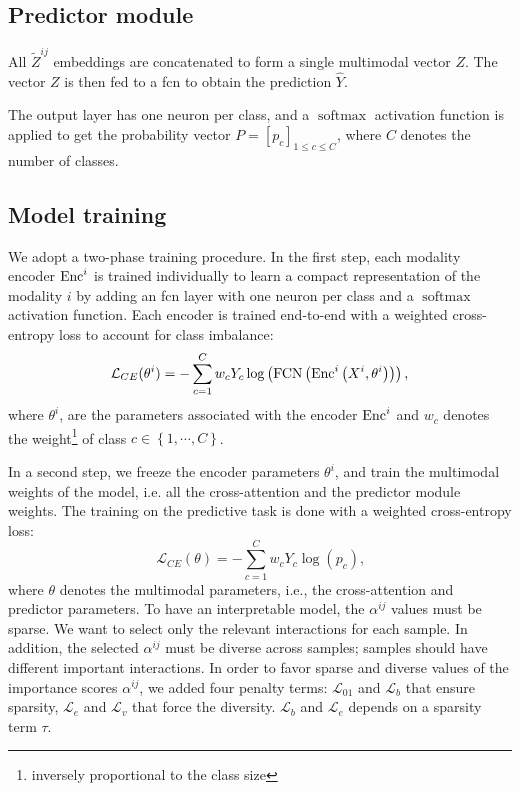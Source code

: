 \documentclass[../main.tex]{subfiles}
\begin{document}
 \subsection{Predictor module}

     All \(\tilde{Z}^{ij}\) embeddings are concatenated to form a single multimodal vector $Z$.
     The vector $Z$ is then fed to a \gls{fcn} to obtain the prediction $\hat{Y}$.

     The output layer has one neuron per class, and a $\operatorname{softmax}$ activation function is applied to get the probability vector ${P = \left[p_c\right]_{1\leq c\leq C}}$, where $C$ denotes the number of classes.

 \subsection{Model training}
     We adopt a two-phase training procedure.
     In the first step, each modality encoder $\operatorname{Enc}^i$ is trained individually to learn a compact representation of the modality $i$ by adding an \gls{fcn} layer with one neuron per class and a $\operatorname{softmax}$ activation function.
     Each encoder is trained end-to-end with a weighted cross-entropy loss to account for class imbalance:
     \begin{equation*}
         \mathcal{L}_{CE}(\theta^{i}) = - \sum_{c=1}^{C}w_c Y_c \log\left( \operatorname{FCN}\left(\operatorname{Enc}^{i}\left(X^{i}, \theta^{i}\right)\right)\right) \text{,}
     \end{equation*}
     where \( \theta^{i}\), are the parameters associated with the encoder \(\operatorname{Enc}^{i}\) and \(w_c\) denotes the weight\footnote{inversely proportional to the class size} of class $c \in \left\{1, \cdots,C \right\}$.

     In a second step, we freeze the encoder parameters \(\theta^i\), and train the multimodal weights of the model, i.e. all the cross-attention and the predictor module weights.
     The training on the predictive task is done with a weighted cross-entropy loss:
     \begin{equation*}
         \mathcal{L}_{CE}(\theta) = - \sum_{c=1}^{C}w_c Y_c \log\left( p_c\right) \text{,}
     \end{equation*}
     where $\theta$ denotes the multimodal parameters, i.e., the cross-attention and predictor parameters.
     To have an interpretable model, the \(\alpha^{ij}\) values must be sparse.
     We want to select only the relevant interactions for each sample.
     In addition, the selected \(\alpha^{ij}\) must be diverse across samples; samples should have different important interactions.
     In order to favor sparse and diverse values of the importance scores \(\alpha^{ij}\), we added four penalty terms: \(\mathcal{L}_{01}\) and \(\mathcal{L}_{b}\) that ensure sparsity, \(\mathcal{L}_{e}\) and \(\mathcal{L}_{v}\) that force the diversity.
     \(\mathcal{L}_{b}\) and \(\mathcal{L}_{e}\) depends on a sparsity term \(\tau\).
\end{document}
